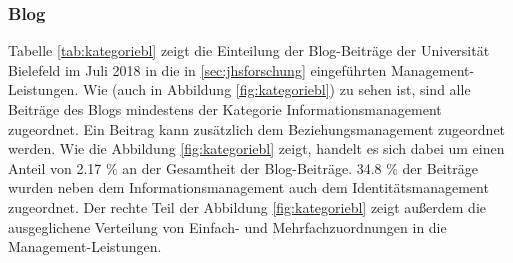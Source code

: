 \subsubsection{Blog}

Tabelle \ref{tab:kategoriebl} zeigt die Einteilung der Blog-Beiträge der Universität Bielefeld im Juli 2018 in die in \ref{sec:jhsforschung} eingeführten Management-Leistungen. Wie (auch in Abbildung \ref{fig:kategoriebl}) zu sehen ist, sind alle Beiträge des Blogs mindestens der Kategorie Informationsmanagement zugeordnet. Ein Beitrag kann zusätzlich dem Beziehungsmanagement zugeordnet werden. Wie die Abbildung \ref{fig:kategoriebl} zeigt, handelt es sich dabei um einen Anteil von 2.17 \% an der Gesamtheit der Blog-Beiträge. 34.8 \% der Beiträge wurden neben dem Informationsmanagement auch dem Identitätsmanagement zugeordnet. Der rechte Teil der Abbildung \ref{fig:kategoriebl} zeigt außerdem die ausgeglichene Verteilung von Einfach- und Mehrfachzuordnungen in die Management-Leistungen.

\begin{table}[H]
    \caption{Blog Beiträge der Universität Bielefeld im Juli 2018 und ihre Zuordnung zu den Management-Leistungen nach Schmidt.}
\label{tab:kategoriebl}
\end{table}

